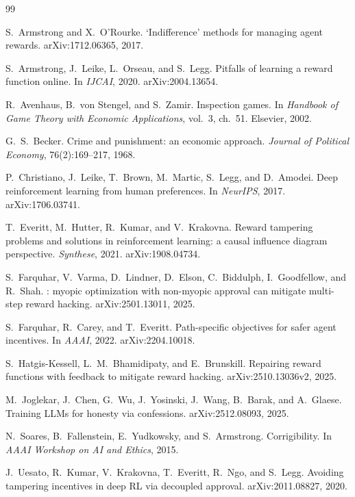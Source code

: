 \documentclass[11pt]{article}
\begin{document}
\begin{thebibliography}{99}
\small
\setlength{\itemsep}{2pt}

S.~Armstrong and X.~O'Rourke.
\newblock `Indifference' methods for managing agent rewards.
\newblock arXiv:1712.06365, 2017.

S.~Armstrong, J.~Leike, L.~Orseau, and S.~Legg.
\newblock Pitfalls of learning a reward function online.
\newblock In \emph{IJCAI}, 2020. arXiv:2004.13654.

R.~Avenhaus, B.~von Stengel, and S.~Zamir.
\newblock Inspection games.
\newblock In \emph{Handbook of Game Theory with Economic Applications}, vol.~3,
  ch.~51. Elsevier, 2002.

G.~S.~Becker.
\newblock Crime and punishment: an economic approach.
\newblock \emph{Journal of Political Economy}, 76(2):169--217, 1968.

P.~Christiano, J.~Leike, T.~Brown, M.~Martic, S.~Legg, and D.~Amodei.
\newblock Deep reinforcement learning from human preferences.
\newblock In \emph{NeurIPS}, 2017. arXiv:1706.03741.

T.~Everitt, M.~Hutter, R.~Kumar, and V.~Krakovna.
\newblock Reward tampering problems and solutions in reinforcement learning: a
  causal influence diagram perspective.
\newblock \emph{Synthese}, 2021. arXiv:1908.04734.

S.~Farquhar, V.~Varma, D.~Lindner, D.~Elson, C.~Biddulph, I.~Goodfellow, and
  R.~Shah.
: myopic optimization with non-myopic approval can mitigate
  multi-step reward hacking.
\newblock arXiv:2501.13011, 2025.

S.~Farquhar, R.~Carey, and T.~Everitt.
\newblock Path-specific objectives for safer agent incentives.
\newblock In \emph{AAAI}, 2022. arXiv:2204.10018.

S.~Hatgis-Kessell, L.~M.~Bhamidipaty, and E.~Brunskill.
\newblock Repairing reward functions with feedback to mitigate reward hacking.
\newblock arXiv:2510.13036v2, 2025.

M.~Joglekar, J.~Chen, G.~Wu, J.~Yosinski, J.~Wang, B.~Barak, and A.~Glaese.
\newblock Training {LLMs} for honesty via confessions.
\newblock arXiv:2512.08093, 2025.

N.~Soares, B.~Fallenstein, E.~Yudkowsky, and S.~Armstrong.
\newblock Corrigibility.
\newblock In \emph{AAAI Workshop on AI and Ethics}, 2015.

J.~Uesato, R.~Kumar, V.~Krakovna, T.~Everitt, R.~Ngo, and S.~Legg.
\newblock Avoiding tampering incentives in deep {RL} via decoupled approval.
\newblock arXiv:2011.08827, 2020.

\end{thebibliography}
\end{document}
